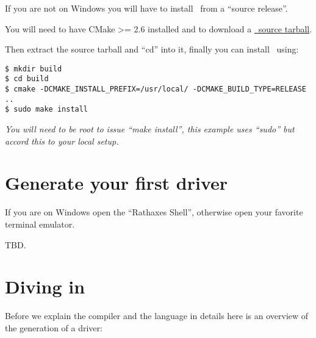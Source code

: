 \documentclass[american]{rtxarticle}
\begin{document}
If you are not on Windows you will have to install \rtx\ from a ``source
release''.

You will need to have CMake >= 2.6 installed and to download a
\href{http://rathaxes.googlecode.com/files/rathaxes-src-latest.tar.gz}{\rtx\ source tarball}.

Then extract the source tarball and ``cd'' into it, finally you can install
\rtx\ using:

\begin{lstlisting}
$ mkdir build
$ cd build
$ cmake -DCMAKE_INSTALL_PREFIX=/usr/local/ -DCMAKE_BUILD_TYPE=RELEASE ..
$ sudo make install
\end{lstlisting}

\emph{You will need to be root to issue ``make install'', this example uses
``sudo'' but accord this to your local setup.}

\section{Generate your first driver}

If you are on Windows open the ``Rathaxes Shell'', otherwise open your favorite
terminal emulator.

TBD.

\newpage

\section{Diving in}

Before we explain the compiler and the language in details here is an overview
of the generation of a driver:
\end{document}
